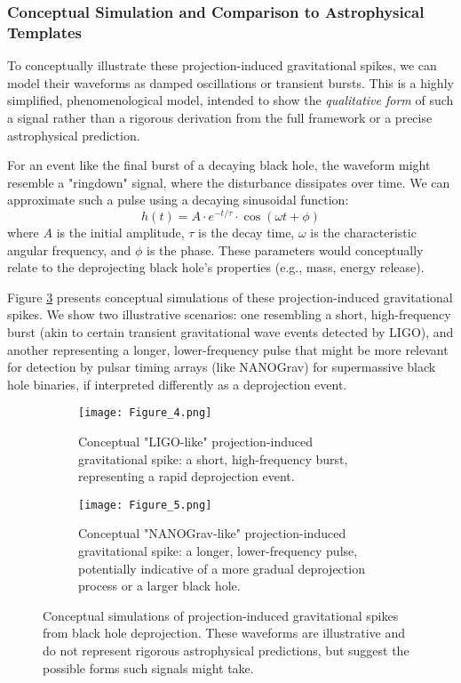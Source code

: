\documentclass[12pt,a4paper]{article}
\numberwithin{equation}{section}
\begin{document}
\subsubsection{Conceptual Simulation and Comparison to Astrophysical Templates}
To conceptually illustrate these projection-induced gravitational spikes, we can model their waveforms as damped oscillations or transient bursts. This is a highly simplified, phenomenological model, intended to show the \textit{qualitative form} of such a signal rather than a rigorous derivation from the full framework or a precise astrophysical prediction.

For an event like the final burst of a decaying black hole, the waveform might resemble a "ringdown" signal, where the disturbance dissipates over time. We can approximate such a pulse using a decaying sinusoidal function:
\begin{equation}
h(t) = A \cdot e^{-t/\tau} \cdot \cos(\omega t + \phi)
\end{equation}
where $A$ is the initial amplitude, $\tau$ is the decay time, $\omega$ is the characteristic angular frequency, and $\phi$ is the phase. These parameters would conceptually relate to the deprojecting black hole's properties (e.g., mass, energy release).

Figure \ref{fig:gravitational_spikes} presents conceptual simulations of these projection-induced gravitational spikes. We show two illustrative scenarios: one resembling a short, high-frequency burst (akin to certain transient gravitational wave events detected by LIGO), and another representing a longer, lower-frequency pulse that might be more relevant for detection by pulsar timing arrays (like NANOGrav) for supermassive black hole binaries, if interpreted differently as a deprojection event.

\begin{figure}[H]
    \centering
    \begin{subfigure}[b]{0.8\textwidth}
        \centering
        \texttt{[image: Figure\_4.png]} %
        \caption{Conceptual "LIGO-like" projection-induced gravitational spike: a short, high-frequency burst, representing a rapid deprojection event.}
        \label{fig:grav_spike_ligo}
    \end{subfigure}
    \vspace{1em}
    \begin{subfigure}[b]{0.8\textwidth}
        \centering
        \texttt{[image: Figure\_5.png]} %
        \caption{Conceptual "NANOGrav-like" projection-induced gravitational spike: a longer, lower-frequency pulse, potentially indicative of a more gradual deprojection process or a larger black hole.}
        \label{fig:grav_spike_nanograv}
    \end{subfigure}
    \caption{Conceptual simulations of projection-induced gravitational spikes from black hole deprojection. These waveforms are illustrative and do not represent rigorous astrophysical predictions, but suggest the possible forms such signals might take.}
    \label{fig:gravitational_spikes}
\end{figure}
\end{document}
